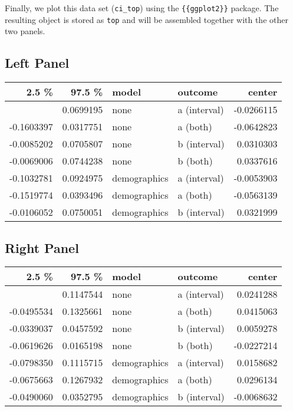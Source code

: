 \documentclass[
  a4paper,
  DIV=11,
  numbers=noendperiod]{scrreprt}
\begin{document}
Finally, we plot this data set (\texttt{ci\_top}) using the
\texttt{\{\{ggplot2\}\}} package. The resulting object is stored as
\texttt{top} and will be assembled together with the other two panels.

\hypertarget{left-panel}{%
\subsection{Left Panel}\label{left-panel}}

\begin{longtable}[]{@{}rrllr@{}}
\toprule\noalign{}
2.5 \% & 97.5 \% & model & outcome & center \\
\midrule\noalign{}
\endhead
\bottomrule\noalign{}
\endlastfoot
-0.1231424 & 0.0699195 & none & a (interval) & -0.0266115 \\
-0.1603397 & 0.0317751 & none & a (both) & -0.0642823 \\
-0.0085202 & 0.0705807 & none & b (interval) & 0.0310303 \\
-0.0069006 & 0.0744238 & none & b (both) & 0.0337616 \\
-0.1032781 & 0.0924975 & demographics & a (interval) & -0.0053903 \\
-0.1519774 & 0.0393496 & demographics & a (both) & -0.0563139 \\
-0.0106052 & 0.0750051 & demographics & b (interval) & 0.0321999 \\
\end{longtable}

\hypertarget{right-panel}{%
\subsection{Right Panel}\label{right-panel}}

\begin{longtable}[]{@{}rrllr@{}}
\toprule\noalign{}
2.5 \% & 97.5 \% & model & outcome & center \\
\midrule\noalign{}
\endhead
\bottomrule\noalign{}
\endlastfoot
-0.0664967 & 0.1147544 & none & a (interval) & 0.0241288 \\
-0.0495534 & 0.1325661 & none & a (both) & 0.0415063 \\
-0.0339037 & 0.0457592 & none & b (interval) & 0.0059278 \\
-0.0619626 & 0.0165198 & none & b (both) & -0.0227214 \\
-0.0798350 & 0.1115715 & demographics & a (interval) & 0.0158682 \\
-0.0675663 & 0.1267932 & demographics & a (both) & 0.0296134 \\
-0.0490060 & 0.0352795 & demographics & b (interval) & -0.0068632 \\
\end{longtable}
\end{document}
